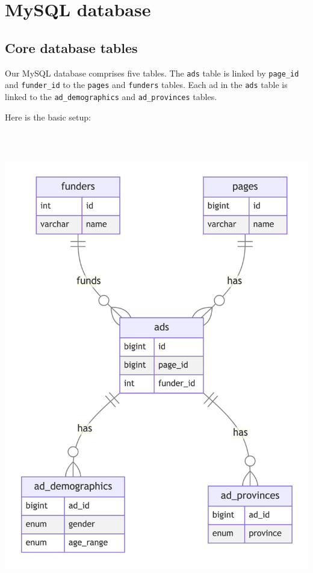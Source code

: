 \documentclass[
  letterpaper,
  DIV=11,
  numbers=noendperiod]{scrreprt}
\begin{document}

\chapter{MySQL database}\label{sec-database}

\section{Core database tables}\label{core-database-tables}

Our MySQL database comprises five tables. The \texttt{ads} table is
linked by \texttt{page\_id} and \texttt{funder\_id} to the
\texttt{pages} and \texttt{funders} tables. Each ad in the \texttt{ads}
table is linked to the \texttt{ad\_demographics} and
\texttt{ad\_provinces} tables.

Here is the basic setup:

\includegraphics[width=6in,height=8.05in]{database_files/figure-latex/mermaid-figure-1.png}
\end{document}
